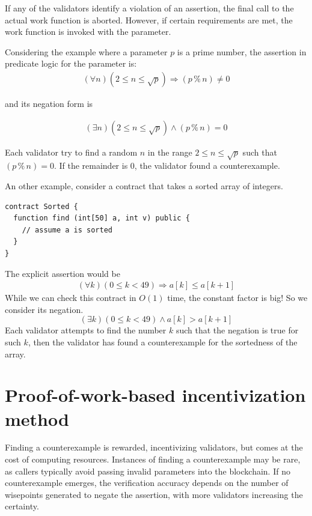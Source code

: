 \documentclass[runningheads]{llncs}
\begin{document}

If any of the validators identify a violation of an assertion, the final call to the actual work function is aborted. However, if certain requirements are met, the work function is invoked with the parameter.
 
Considering the example where a parameter $p$ is a prime number, the assertion in predicate logic for the parameter is:
\begin{gather}\label{eq:3a}
  (\forall n) (2 \le n \le \sqrt p) \Rightarrow (p \mathbin{\%} n) \ne 0
\end{gather}


\noindent and its negation form is 

\begin{gather}\label{eq:3b}
  (\exists n) (2 \le n \le \sqrt p) \wedge (p \mathbin{\%} n) = 0
\end{gather}

Each validator try to find  a
random $n$ in the range $2 \le n \le 
\sqrt p$ such that $(p \mathbin{\%} n) = 0$. If the remainder is $0$, the validator found a counterexample.

An other example, consider a contract that takes a sorted array of integers.
\begin{lstlisting}[numbers=none]
contract Sorted {
  function find (int[50] a, int v) public {
    // assume a is sorted
  }
}
\end{lstlisting}
The explicit assertion would be
\begin{gather}\label{eq:1}
  (\forall k) (0\le k <49) \Rightarrow a[k] \le a[k+1]
\end{gather}
While we can check this contract in $O(1)$ time, the constant factor is big! So we
consider its negation.
\begin{displaymath}
  (\exists k) (0\le k <49) \wedge a[k] > a[k+1]
\end{displaymath}
Each validator attempts to find the number $k$ such that the negation is true for such $k$, then the validator has found a counterexample for the sortedness of the array.



\section{Proof-of-work-based incentivization method}
Finding a counterexample is rewarded, incentivizing validators, but comes at the cost of computing resources. Instances of finding a counterexample may be rare, as callers typically avoid passing invalid parameters into the blockchain. If no counterexample emerges, the verification accuracy depends on the number of wisepoints generated to negate the assertion, with more validators increasing the certainty. 
\end{document}
